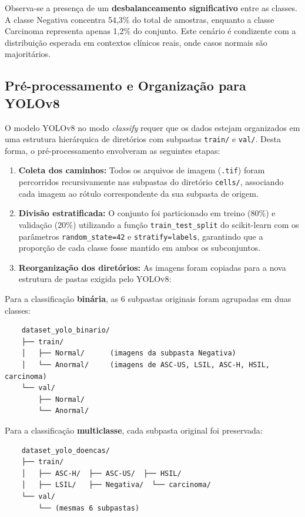 \documentclass[12pt, a4paper]{article}
\begin{document}
Observa-se a presença de um \textbf{desbalanceamento significativo} entre as classes. A classe Negativa concentra 54,3\% do total de amostras, enquanto a classe Carcinoma representa apenas 1,2\% do conjunto. Este cenário é condizente com a distribuição esperada em contextos clínicos reais, onde casos normais são majoritários.

\subsection{Pré-processamento e Organização para YOLOv8}

O modelo YOLOv8 no modo \textit{classify} requer que os dados estejam organizados em uma estrutura hierárquica de diretórios com subpastas \texttt{train/} e \texttt{val/}. Desta forma, o pré-processamento envolveram as seguintes etapas:

\begin{enumerate}
    \item \textbf{Coleta dos caminhos:} Todos os arquivos de imagem (\texttt{.tif}) foram percorridos recursivamente nas subpastas do diretório \texttt{cells/}, associando cada imagem ao rótulo correspondente da sua subpasta de origem.

    \item \textbf{Divisão estratificada:} O conjunto foi particionado em treino (80\%) e validação (20\%) utilizando a função \texttt{train\_test\_split} do scikit-learn com os parâmetros \texttt{random\_state=42} e \texttt{stratify=labels}, garantindo que a proporção de cada classe fosse mantido em ambos os subconjuntos.

    \item \textbf{Reorganização dos diretórios:} As imagens foram copiadas para a nova estrutura de pastas exigida pelo YOLOv8:
\end{enumerate}

Para a classificação \textbf{binária}, as 6 subpastas originais foram agrupadas em duas classes:
\begin{verbatim}
    dataset_yolo_binario/
    ├── train/
    │   ├── Normal/      (imagens da subpasta Negativa)
    │   └── Anormal/     (imagens de ASC-US, LSIL, ASC-H, HSIL, carcinoma)
    └── val/
        ├── Normal/
        └── Anormal/
\end{verbatim}

Para a classificação \textbf{multiclasse}, cada subpasta original foi preservada:
\begin{verbatim}
    dataset_yolo_doencas/
    ├── train/
    │   ├── ASC-H/  ├── ASC-US/  ├── HSIL/
    │   ├── LSIL/   ├── Negativa/  └── carcinoma/
    └── val/
        └── (mesmas 6 subpastas)
\end{verbatim}
\end{document}
